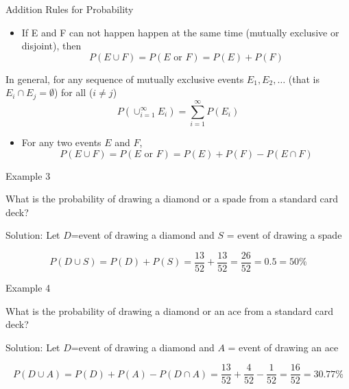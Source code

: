 \documentclass[
  ignorenonframetext,
]{beamer}
\providecommand{\tightlist}{%
  \setlength{\itemsep}{0pt}\setlength{\parskip}{0pt}}
\begin{document}
\begin{frame}{Addition Rules for Probability}
\label{addition-rules-for-probability}
\begin{itemize}
\tightlist
\item
  If E and F can not happen happen at the same time (mutually exclusive
  or disjoint), then \[P(E \cup F)=P(E \text{ or } F)=P(E)+ P(F)\]
\end{itemize}

In general, for any sequence of mutually exclusive events
\(E_1, E_2, \ldots\) (that is \(E_i \cap E_j = \emptyset\)) for all
(\(i\neq j\))
\[P\left(\cup_{i=1}^{\infty} E_i\right)=\sum_{i=1}^{\infty} P(E_i)\]

\begin{itemize}
\tightlist
\item
  For any two events \(E\) and \(F\),
  \[P(E \cup F)=P(E \text{ or } F)=P(E)+ P(F)-P(E\cap F)\]
\end{itemize}
\end{frame}

\begin{frame}{Example 3}
\label{example-3}
\begin{tcolorbox}
What is the probability of drawing a diamond or a spade from a standard card deck?
\end{tcolorbox}

\begin{tcolorbox}
Solution:
Let $D$=event of drawing a diamond and $S$ = event of drawing a spade 

$$P(D\cup S)=P(D)+P(S) =\frac{13}{52} + \frac{13}{52} = \frac{26}{52} = 0.5 = 50\%$$
\end{tcolorbox}
\end{frame}

\begin{frame}{Example 4}
\label{example-4}
\begin{tcolorbox}
What is the probability of drawing a diamond or an ace from a standard card deck?
\end{tcolorbox}

\begin{tcolorbox}
Solution:
Let $D$=event of drawing a diamond and $A$ = event of drawing an ace

$$P(D\cup A)=P(D)+P(A)-P(D\cap A) = \frac{13}{52} + \frac{4}{52}-\frac{1}{52} = \frac{16}{52} = 30.77\%$$
\end{tcolorbox}
\end{frame}
\end{document}
